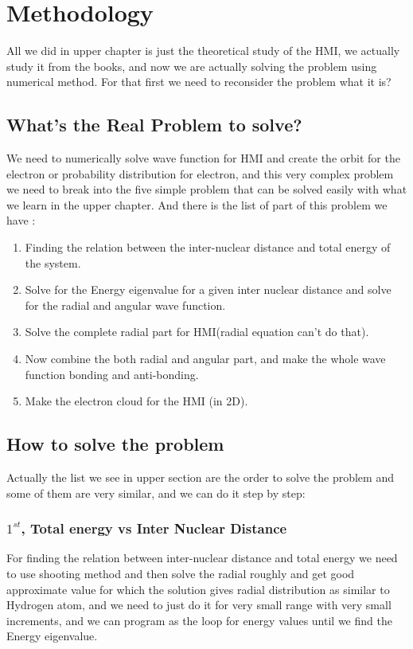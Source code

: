 \documentclass[12pt]{report}
\begin{document}
\chapter{Methodology}
	\normalsize All we did in upper chapter is just the theoretical study of the HMI, we actually study it from the books, and now we are actually solving the problem using numerical method. For that first we need to reconsider the problem what it is?
	\section{What's the Real Problem to solve?}
		\normalsize \boldmath We need to numerically solve wave function for HMI and create the orbit for the electron or probability distribution for electron, and this very complex problem we need to break into the five simple problem that can be solved easily with what we learn in the upper chapter. And there is the list of part of this problem  we have :
		\begin{enumerate}
			\item Finding the relation between the inter-nuclear distance and total energy of the system.
			\item Solve for the Energy eigenvalue for a given inter nuclear distance and solve for the radial and angular wave function.
			\item Solve the complete radial part for HMI(radial equation can't do that).
			\item Now combine the both radial and angular part, and make the whole wave function bonding and anti-bonding.
			\item Make the electron cloud for the HMI (in 2D).
		\end{enumerate}
	\section{How to solve the problem}
		\normalsize Actually the list we see in upper section are the order to solve the problem and some of them are very similar, and we can do it step by step:
		\subsection{$1^{st}$, Total energy vs Inter Nuclear Distance}
			\normalsize For finding the relation between inter-nuclear distance and total energy we need to use shooting method and then solve the radial roughly and get good approximate value for which the solution gives radial distribution as similar to Hydrogen atom, and we need to just do it for very small range with very small increments, and we can program as the loop for energy values until we find the Energy eigenvalue.
\end{document}
